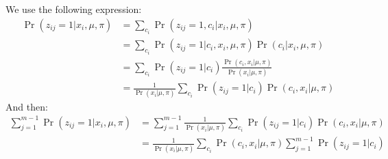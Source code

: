\documentclass[a4paper,12pt]{article}
\begin{document}
\begin{enumerate}
{    We use the following expression:
    \begin{align}
        \Pr(z_{ij}=1|x_i, \mu, \pi) &= \sum_{c_i} \Pr(z_{ij}=1, c_i|x_i, \mu, \pi) \\
        &= \sum_{c_i} \Pr(z_{ij}=1|c_i, x_i, \mu, \pi)\Pr(c_i|x_i, \mu, \pi) \\
        &= \sum_{c_i} \Pr(z_{ij}=1|c_i) \frac{\Pr(c_i, x_i|\mu, \pi)}{\Pr(x_i|\mu, \pi)} \\
        &= \frac{1}{\Pr(x_i|\mu, \pi)} \sum_{c_i} \Pr(z_{ij}=1|c_i) \Pr(c_i, x_i|\mu, \pi) 
    \end{align}
    And then:
    \begin{align}
        \sum_{j=1}^{m-1} \Pr(z_{ij}=1|x_i, \mu, \pi) &= \sum_{j=1}^{m-1} \frac{1}{\Pr(x_i|\mu, \pi)}  \sum_{c_i} \Pr(z_{ij}=1|c_i) \Pr(c_i, x_i|\mu, \pi) \\
        &= \frac{1}{\Pr(x_i|\mu, \pi)} \sum_{c_i} \Pr(c_i, x_i|\mu, \pi)  \sum_{j=1}^{m-1} \Pr(z_{ij}=1|c_i)
    \end{align}
    }

\end{enumerate}
\end{document}
